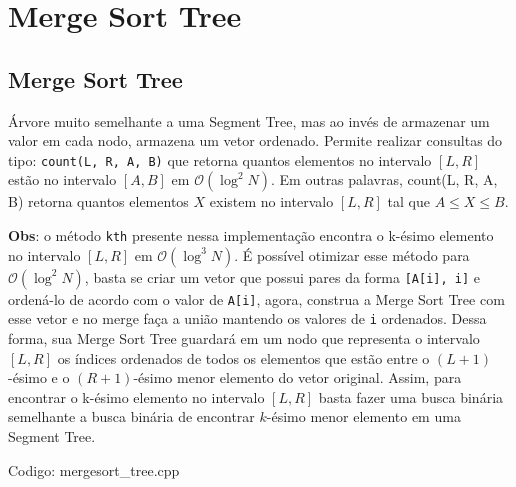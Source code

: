 \documentclass[10pt, a4paper, oneside]{book}
\begin{document}
\section{Merge Sort Tree}
\subsection{Merge Sort Tree}


Árvore muito semelhante a uma Segment Tree, mas ao invés de armazenar um valor em cada nodo, armazena um vetor ordenado. Permite realizar consultas do tipo: \texttt{count(L, R, A, B)} que retorna quantos elementos no intervalo $[L, R]$ estão no intervalo $[A, B]$ em $\mathcal{O}(\log^2 N)$. Em outras palavras, count(L, R, A, B) retorna quantos elementos $X$ existem no intervalo $[L, R]$ tal que $A \leq X \leq B$.



\textbf{Obs}: o método \texttt{kth} presente nessa implementação encontra o k-ésimo elemento no intervalo $[L, R]$ em $\mathcal{O}(\log^3 N)$. É possível otimizar esse método para $\mathcal{O}(\log^2 N)$, basta se criar um vetor que possui pares da forma \texttt{[A[i], i]} e ordená-lo de acordo com o valor de \texttt{A[i]}, agora, construa a Merge Sort Tree com esse vetor e no merge faça a união mantendo os valores de \texttt{i} ordenados. Dessa forma, sua Merge Sort Tree guardará em um nodo que representa o intervalo $[L, R]$ os índices ordenados de todos os elementos que estão entre o $(L + 1)$-ésimo e o $(R + 1)$-ésimo menor elemento do vetor original. Assim, para encontrar o k-ésimo elemento no intervalo $[L, R]$ basta fazer uma busca binária semelhante a busca binária de encontrar $k$-ésimo menor elemento em uma Segment Tree.
\hfill

Codigo: mergesort\_tree.cpp
\end{document}
